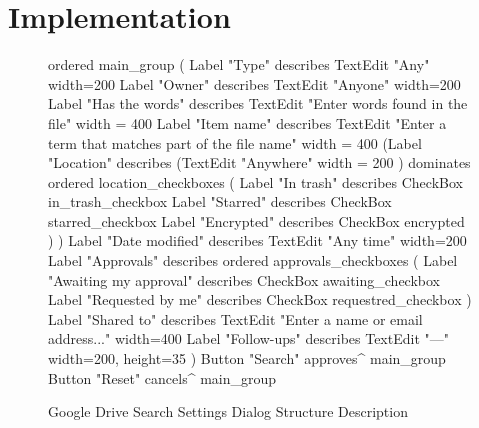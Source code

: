 
\section{Implementation}

\begin{figure}[t]
\begin{verbnobox}[\fontsize{10pt}{10pt}\selectfont]
ordered main_group (
  Label "Type" describes TextEdit "Any" {width=200}
  Label "Owner" describes TextEdit "Anyone" {width=200}
  Label "Has the words" describes TextEdit "Enter words found in the file" {
   width = 400
  }
  Label "Item name" describes
    TextEdit "Enter a term that matches part of the file name" {
      width = 400
    }
  (Label "Location" describes
    (TextEdit "Anywhere" { width = 200 }) dominates
    ordered location_checkboxes (
      Label "In trash"  describes CheckBox in_trash_checkbox
      Label "Starred"   describes CheckBox starred_checkbox
      Label "Encrypted" describes CheckBox encrypted
    )
  )
  Label "Date modified" describes  TextEdit "Any time" {width=200}
  Label "Approvals" describes
    ordered approvals_checkboxes (
      Label "Awaiting my approval" describes CheckBox awaiting_checkbox
      Label "Requested by me" describes CheckBox requestred_checkbox
  )
  Label "Shared to" describes
    TextEdit "Enter a name or email address..." {width=400}
  Label "Follow-ups" describes TextEdit "---" {width=200, height=35}
)
Button "Search" approves^ main_group
Button "Reset" cancels^ main_group
\end{verbnobox}
\caption{Google Drive Search Settings Dialog Structure Description}
\label{gd_structure}
\end{figure}

